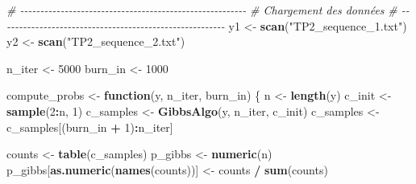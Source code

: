 \documentclass[
]{article}
\newenvironment{Shaded}{\begin{snugshade}}{\end{snugshade}}
\newcommand{\CommentTok}[1]{\textcolor[rgb]{0.56,0.35,0.01}{\textit{#1}}}
\newcommand{\ControlFlowTok}[1]{\textcolor[rgb]{0.13,0.29,0.53}{\textbf{#1}}}
\newcommand{\DecValTok}[1]{\textcolor[rgb]{0.00,0.00,0.81}{#1}}
\newcommand{\FunctionTok}[1]{\textcolor[rgb]{0.13,0.29,0.53}{\textbf{#1}}}
\newcommand{\NormalTok}[1]{#1}
\newcommand{\OtherTok}[1]{\textcolor[rgb]{0.56,0.35,0.01}{#1}}
\newcommand{\SpecialCharTok}[1]{\textcolor[rgb]{0.81,0.36,0.00}{\textbf{#1}}}
\newcommand{\StringTok}[1]{\textcolor[rgb]{0.31,0.60,0.02}{#1}}
\begin{document}
\begin{Shaded}
\begin{Highlighting}[]
\CommentTok{\# {-}{-}{-}{-}{-}{-}{-}{-}{-}{-}{-}{-}{-}{-}{-}{-}{-}{-}{-}{-}{-}{-}{-}{-}{-}{-}{-}{-}{-}{-}{-}{-}{-}{-}{-}{-}{-}{-}{-}{-}{-}{-}{-}{-}{-}{-}{-}{-}{-}{-}{-}{-}{-}{-}{-}{-}}
\CommentTok{\# Chargement des données}
\CommentTok{\# {-}{-}{-}{-}{-}{-}{-}{-}{-}{-}{-}{-}{-}{-}{-}{-}{-}{-}{-}{-}{-}{-}{-}{-}{-}{-}{-}{-}{-}{-}{-}{-}{-}{-}{-}{-}{-}{-}{-}{-}{-}{-}{-}{-}{-}{-}{-}{-}{-}{-}{-}{-}{-}{-}{-}{-}}
\NormalTok{y1 }\OtherTok{\textless{}{-}} \FunctionTok{scan}\NormalTok{(}\StringTok{"TP2\_sequence\_1.txt"}\NormalTok{)}
\NormalTok{y2 }\OtherTok{\textless{}{-}} \FunctionTok{scan}\NormalTok{(}\StringTok{"TP2\_sequence\_2.txt"}\NormalTok{)}

\NormalTok{n\_iter }\OtherTok{\textless{}{-}} \DecValTok{5000}
\NormalTok{burn\_in }\OtherTok{\textless{}{-}} \DecValTok{1000}

\NormalTok{compute\_probs }\OtherTok{\textless{}{-}} \ControlFlowTok{function}\NormalTok{(y, n\_iter, burn\_in) \{}
\NormalTok{  n }\OtherTok{\textless{}{-}} \FunctionTok{length}\NormalTok{(y)}
\NormalTok{  c\_init }\OtherTok{\textless{}{-}} \FunctionTok{sample}\NormalTok{(}\DecValTok{2}\SpecialCharTok{:}\NormalTok{n, }\DecValTok{1}\NormalTok{)}
\NormalTok{  c\_samples }\OtherTok{\textless{}{-}} \FunctionTok{GibbsAlgo}\NormalTok{(y, n\_iter, c\_init)}
\NormalTok{  c\_samples }\OtherTok{\textless{}{-}}\NormalTok{ c\_samples[(burn\_in }\SpecialCharTok{+} \DecValTok{1}\NormalTok{)}\SpecialCharTok{:}\NormalTok{n\_iter]}

\NormalTok{  counts }\OtherTok{\textless{}{-}} \FunctionTok{table}\NormalTok{(c\_samples)}
\NormalTok{  p\_gibbs }\OtherTok{\textless{}{-}} \FunctionTok{numeric}\NormalTok{(n)}
\NormalTok{  p\_gibbs[}\FunctionTok{as.numeric}\NormalTok{(}\FunctionTok{names}\NormalTok{(counts))] }\OtherTok{\textless{}{-}}\NormalTok{ counts }\SpecialCharTok{/} \FunctionTok{sum}\NormalTok{(counts)}


\end{Highlighting}
\end{Shaded}
\end{document}
